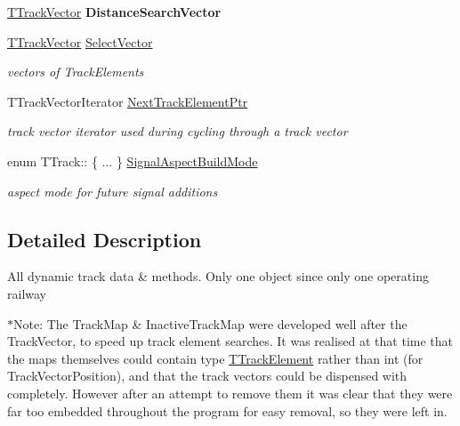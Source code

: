 \begin{DoxyCompactItemize}
\mbox{\label{class_t_track_a5a8edb559dc624c4bcab8ac2d61d83eb}} 
\mbox{\hyperlink{class_t_track_ac64e15050a0faf07c1b7410d60cbcbe5}{T\+Track\+Vector}} {\bfseries Distance\+Search\+Vector}
\item 
\mbox{\label{class_t_track_aa1317775189eeb24f2f2190789243fce}} 
\mbox{\hyperlink{class_t_track_ac64e15050a0faf07c1b7410d60cbcbe5}{T\+Track\+Vector}} \mbox{\hyperlink{class_t_track_aa1317775189eeb24f2f2190789243fce}{Select\+Vector}}
\begin{DoxyCompactList}\small\item\em vectors of Track\+Elements \end{DoxyCompactList}\item 
\mbox{\label{class_t_track_a5a3eca45e68b0b2d5604b096e26d79f5}} 
T\+Track\+Vector\+Iterator \mbox{\hyperlink{class_t_track_a5a3eca45e68b0b2d5604b096e26d79f5}{Next\+Track\+Element\+Ptr}}
\begin{DoxyCompactList}\small\item\em track vector iterator used during cycling through a track vector \end{DoxyCompactList}\item 
\mbox{\label{class_t_track_ab012f6fbdca9a4a0354885c557f41736}} 
enum T\+Track\+:: \{ ... \}  \mbox{\hyperlink{class_t_track_ab012f6fbdca9a4a0354885c557f41736}{Signal\+Aspect\+Build\+Mode}}
\begin{DoxyCompactList}\small\item\em aspect mode for future signal additions \end{DoxyCompactList}\end{DoxyCompactItemize}


\subsection{Detailed Description}
All dynamic track data \& methods. Only one object since only one operating railway

$\ast$\+Note\+: The Track\+Map \& Inactive\+Track\+Map were developed well after the Track\+Vector, to speed up track element searches. It was realised at that time that the maps themselves could contain type \mbox{\hyperlink{class_t_track_element}{T\+Track\+Element}} rather than int (for Track\+Vector\+Position), and that the track vectors could be dispensed with completely. However after an attempt to remove them it was clear that they were far too embedded throughout the program for easy removal, so they were left in. 

